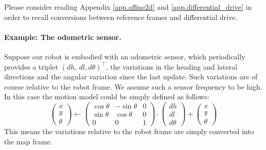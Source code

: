 		Please consider reading Appendix \ref{app.affine2d} and \ref{app.differential_drive} in order to recall conversions between reference frames and differential drive.
		
	\paragraph{Example: The odometric sensor.}
		Suppose our robot is embodied with an odometric sensor, which periodically provides a triplet $(dh,\, dl, d\theta)^\top$, \ie{} the variations in the heading and lateral directions and the angular variation since the last update. 
		Such variations are of course relative to the robot frame.
		We assume such a sensor frequency to be high.
		In this case the motion model could be simply defined as follows:
		\begin{equation}
			\label{eq.motion.odometrix}
			\left(\begin{array}{c}
				x \\ y \\ \theta
			\end{array}\right)
			\leftarrow
			\left(\begin{array}{ccc}
				\cos{\theta} & -\sin{\theta} & 0 \\
				\sin{\theta} & \cos{\theta} & 0 \\
				0 & 0 & 1
			\end{array}\right)
			\cdot
			\left(\begin{array}{c}
				dh \\
				dl \\
				d\theta
			\end{array}\right)
			+
			\left(\begin{array}{c}
				x \\ y \\ \theta
			\end{array}\right)
		\end{equation}
		This means the variations relative to the robot frame are simply converted into the map frame.
